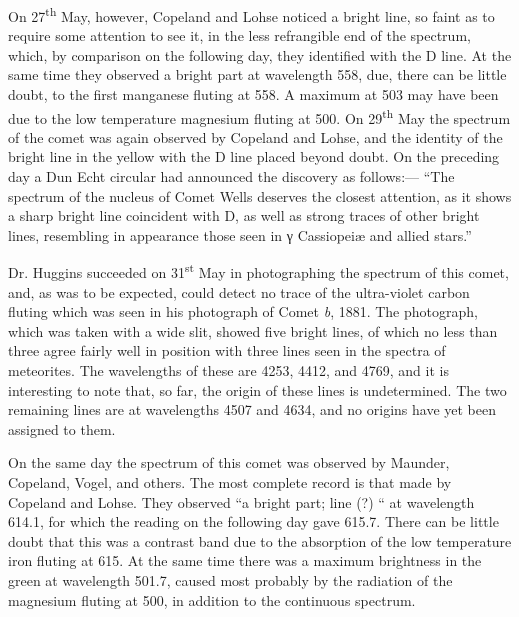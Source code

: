 \documentclass[a4paper, 12pt, oneside, polutonikogreek, english]{article}
\begin{document}
On 27\textsuperscript{th} May, however, Copeland and Lohse noticed a bright line, so faint as to require some attention to see it, in the less refrangible end of the spectrum, which, by comparison on the following day, they identified with the D line. At the same time they observed a bright part at wavelength 558, due, there can be little doubt, to the first manganese fluting at 558. A maximum at 503 may have been due to the low temperature magnesium fluting at 500. On 29\textsuperscript{th} May the spectrum of the comet was again observed by Copeland and Lohse, and the identity of the bright line in the yellow with the D line placed beyond doubt. On the preceding day a Dun Echt circular had announced the discovery as follows:--- ``The spectrum of the nucleus of Comet Wells deserves the closest attention, as it shows a sharp bright line coincident with D, as well as strong traces of other bright lines, resembling in appearance those seen in γ Cassiopeiæ and allied stars.''

Dr. Huggins succeeded on 31\textsuperscript{st} May in photographing the spectrum of this comet, and, as was to be expected, could detect no trace of the ultra-violet carbon fluting which was seen in his photograph of Comet \emph{b}, 1881. The photograph, which was taken with a wide slit, showed five bright lines, of which no less than three agree fairly well in position with three lines seen in the spectra of meteorites. The wavelengths of these are 4253, 4412, and 4769, and it is interesting to note that, so far, the origin of these lines is undetermined. The two remaining lines are at wavelengths 4507 and 4634, and no origins have yet been assigned to them.

On the same day the spectrum of this comet was observed by Maunder, Copeland, Vogel, and others. The most complete record is that made by Copeland and Lohse. They observed ``a bright part; line (?) `` at wavelength 614.1, for which the reading on the following day gave 615.7. There can be little doubt that this was a contrast band due to the absorption of the low temperature iron fluting at 615. At the same time there was a maximum brightness in the green at wavelength 501.7, caused most probably by the radiation of the magnesium fluting at 500, in addition to the continuous spectrum.
\end{document}
